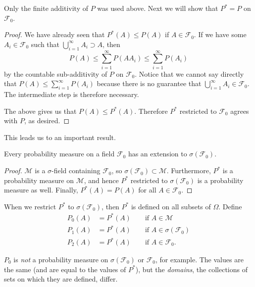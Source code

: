\documentclass[11pt,fleqn]{book} %
\begin{document}
Only the finite additivity of $P$ was used above. Next we will show that $P^*=P$ on $\mathcal{F}_0$.

\begin{proof}
	We have already seen that $P^*(A) \leq P(A)$ if $A \in \mathcal{F}_0$. If we have some $A_i \in \mathcal{F}_0$ such that $\bigcup_{i=1}^\infty A_i \supset A$, then
	\[
		P(A) \leq \sum_{i=1}^\infty P(AA_i) \leq \sum_{i=1}^\infty P(A_i)
	\]
	by the countable sub-additivity of $P$ on $\mathcal{F}_0$. Notice that we cannot say directly that $P(A) \leq \sum_{i=1}^\infty P(A_i)$ because there is no guarantee that $\bigcup_{i=1}^\infty A_i \in \mathcal{F}_0$. The intermediate step is therefore necessary.

	The above gives us that $P(A) \leq P^*(A)$. Therefore $P^*$ restricted to $\mathcal{F}_0$ agrees with $P$, as desired.
\end{proof}

This leads us to an important result.

\begin{theorem} \label{thm:extension}
	Every probability measure on a field $\mathcal{F}_0$ has an extension to $\sigma(\mathcal{F}_0)$.
\end{theorem}

\begin{proof}
	$\mathcal{M}$ is a $\sigma$-field containing $\mathcal{F}_0$, so $\sigma(\mathcal{F}_0) \subset \mathcal{M}$. Furthermore, $P^*$ is a probability measure on $\mathcal{M}$, and hence $P^*$ restricted to $\sigma(\mathcal{F}_0)$ is a probability measure as well. Finally, $P^*(A)=P(A)$ for all $A \in \mathcal{F}_0$.
\end{proof}

When we restrict $P^*$ to $\sigma(\mathcal{F}_0)$, then $P^*$ is defined on all subsets of $\Omega$. Define
\begin{align*}
	P_0(A) &= P^*(A) \qquad \textrm{if } A \in \mathcal{M} \\
	P_1(A) &= P^*(A) \qquad \textrm{if } A \in \sigma(\mathcal{F}_0) \\
	P_2(A) &= P^*(A) \qquad \textrm{if } A \in \mathcal{F}_0.
\end{align*}

$P_0$ is \emph{not} a probability measure on $\sigma(\mathcal{F}_0)$ or $\mathcal{F}_0$, for example. The values are the same (and are equal to the values of $P^*$), but the \emph{domains}, the collections of sets on which they are defined, differ.
\end{document}
